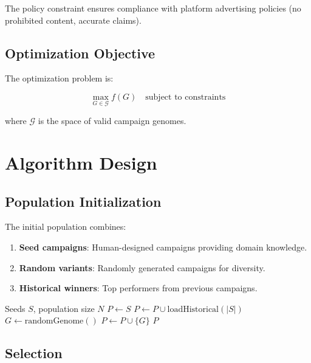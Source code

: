 \documentclass[11pt,twocolumn]{article}
\begin{document}
The policy constraint ensures compliance with platform advertising policies (no prohibited content, accurate claims).

\subsection{Optimization Objective}

The optimization problem is:

\begin{equation}
\max_{G \in \mathcal{G}} f(G) \quad \text{subject to constraints}
\end{equation}

where $\mathcal{G}$ is the space of valid campaign genomes.

\section{Algorithm Design}

\subsection{Population Initialization}

The initial population combines:

\begin{enumerate}
\item \textbf{Seed campaigns}: Human-designed campaigns providing domain knowledge.
\item \textbf{Random variants}: Randomly generated campaigns for diversity.
\item \textbf{Historical winners}: Top performers from previous campaigns.
\end{enumerate}

\begin{algorithm}
\caption{Population Initialization}
\begin{algorithmic}[1]
\REQUIRE Seeds $S$, population size $N$
\STATE $P \leftarrow S$
\STATE $P \leftarrow P \cup \text{loadHistorical}(|S|)$
    \STATE $G \leftarrow \text{randomGenome}()$
        \STATE $P \leftarrow P \cup \{G\}$
    \ENDIF
\ENDWHILE
\RETURN $P$
\end{algorithmic}
\end{algorithm}

\subsection{Selection}
\end{document}
